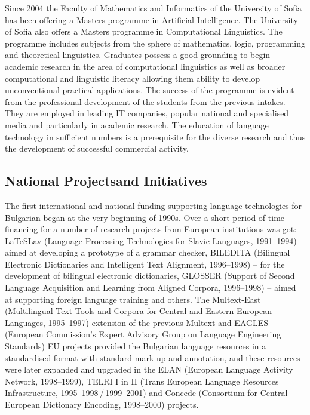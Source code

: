\begin{multicols}{2}
  Since 2004 the Faculty of Mathematics and Informatics of the University of Sofia has been offering a Masters programme in Artificial Intelligence. The University of Sofia also offers a Masters programme in Computational Linguistics. The programme includes subjects from the sphere of mathematics, logic, programming and theoretical linguistics. Graduates possess a good grounding to begin academic research in the area of computational linguistics as well as broader computational and linguistic literacy allowing them ability to develop unconventional practical applications. The success of the programme is evident from the professional development of the students from the previous intakes. They are employed in leading IT companies, popular national and specialised media and particularly in academic research.
  The education of language technology in sufficient numbers is a prerequisite for the diverse research and thus the development of successful commercial activity.

  \subsection[National Projects and Initiatives]{National Projects\newline and Initiatives}

  The first international and national funding supporting language technologies for Bulgarian began at the very beginning of 1990s. Over a short period of time financing for a number of research projects from European institutions was got: LaTeSLav (Language Processing Technologies for Slavic Languages, 1991--1994) -- aimed at developing a prototype of a grammar checker, BILEDITA (Bilingual Electronic Dictionaries and Intelligent Text Alignment, 1996--1998) -- for the development of bilingual electronic dictionaries, GLOSSER (Support of Second Language Acquisition and Learning from Aligned Corpora, 1996--1998) -- aimed at supporting foreign language training and others. The Multext-East (Multilingual Text Tools and Corpora for Central and Eastern European Languages, 1995--1997) extension of the previous Multext and EAGLES (European Commission's Expert Advisory Group on Language Engineering Standards) EU projects provided the Bulgarian language resources in a standardised format
    with standard mark-up and annotation, and these resources were later expanded and upgraded in the ELAN (European Language Activity Network, 1998--1999), TELRI I in II (Trans European Language Resources Infrastructure, 1995--1998\,/\,1999--2001) and Concede (Consortium for Central European Dictionary Encoding, 1998--2000) projects.


\end{multicols}
